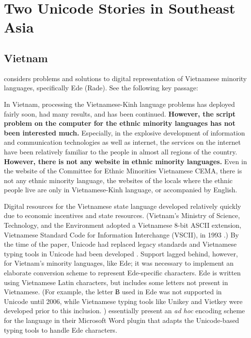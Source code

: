 \section{Two Unicode Stories in Southeast Asia}

\subsection{Vietnam}

\textcite{my13} considers problems and solutions to digital representation of
Vietnamese minority languages, specifically Ede (Rade). See the following key passage:

\begin{aquote}{\textcite{my13}}
In Vietnam, processing the Vietnamese-Kinh language problems has deployed fairly
soon, had many results, and has been continued. \textbf{However, the script
problem on the computer for the ethnic minority languages has not been
interested much.} Especially, in the explosive development of information and
communication technologies as well as internet, the services on the internet
have been relatively familiar to the people in almost all regions of the
country. \textbf{However, there is not any website in ethnic minority
languages.} Even in the website of the Committee for Ethnic Minorities
Vietnamese CEMA, there is not any ethnic minority language, the websites of the
locals where the ethnic people live are only in Vietnamese-Kinh language, or
accompanied by English.
\end{aquote}

Digital resources for the Vietnamese state language developed relatively quickly
due to economic incentives and state resources. (Vietnam's Ministry of Science,
Technology, and the Environment adopted a Vietnamese 8-bit ASCII extension,
Vietnamese Standard Code for Information Interchange (VSCII), in 1993
\parencite{vscii93}.) By the time of the paper, Unicode had replaced legacy
standards and Vietnamese typing tools in Unicode had been developed
\parencite{nguyen18}. Support lagged behind, however, for Vietnam's minority
languages, like Ede; it was necessary to implement an elaborate conversion
scheme to represent Ede-specific characters. Ede is written using Vietnamese
Latin characters, but includes some letters not present in Vietnamese. (For
example, the letter {\unicode Ƀ} used in Ede was not supported in Unicode until 2006, while
Vietnamese typing tools like Unikey and Vietkey were developed prior to this
inclusion. \parencite{b-with-stroke}) \textcite{my13} essentially present an
\textit{ad hoc} encoding scheme for the language in their Microsoft Word plugin
that adapts the Unicode-based typing tools to handle Ede characters.

